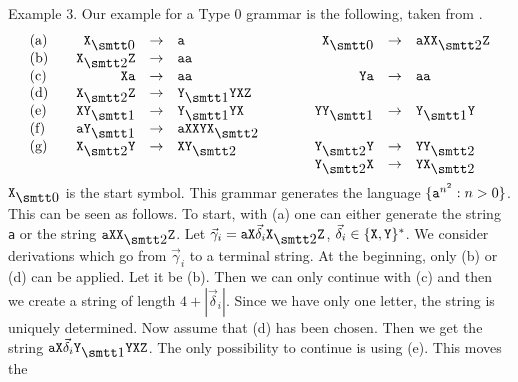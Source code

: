 {\sc Example 3.}
Our example for a Type 0 grammar is the following, taken from
\cite{salomaa:formal}.
\begin{equation}
\begin{array}{l@{\qquad}r@{\quad \pf \quad}l@{\qquad\qquad}%
r@{\quad \pf \quad}l}
{\rm (a)} & \mbox{\tt X}_{\snull}   & \mbox{\tt a}
    & \mbox{\tt X}_{\snull}   & \mbox{\tt aXX}_{\szwei} \mbox{\tt Z} \\
{\rm (b)} & \mbox{\tt X}_{\szwei} \mbox{\tt Z} & \mbox{\tt aa}
    & \multicolumn{2}{c}{} \\
{\rm (c)} & \mbox{\tt Xa}    & \mbox{\tt aa}
    & \mbox{\tt Ya}    & \mbox{\tt aa} \\
{\rm (d)} & \mbox{\tt X}_{\szwei} \mbox{\tt Z} & \mbox{\tt Y}_{\seins} \mbox{\tt YXZ}
    & \multicolumn{2}{c}{} \\
{\rm (e)} & \mbox{\tt XY}_{\seins} & \mbox{\tt Y}_{\seins} \mbox{\tt YX}
    & \mbox{\tt YY}_{\seins} & \mbox{\tt Y}_{\seins} \mbox{\tt Y} \\
{\rm (f)} & \mbox{\tt aY}_{\seins} & \mbox{\tt aXXYX}_{\szwei}
    & \multicolumn{2}{c}{} \\
{\rm (g)} & \mbox{\tt X}_{\szwei}\mbox{\tt Y}  & \mbox{\tt XY}_{\szwei}
    & \mbox{\tt Y}_{\szwei} \mbox{\tt Y} & \mbox{\tt YY}_{\szwei} \\
\multicolumn{3}{c}{}
    & \mbox{\tt Y}_{\szwei} \mbox{\tt X} & \mbox{\tt YX}_{\szwei}
\end{array}
\end{equation}
$\mbox{\tt X}_{\snull}$ is the start symbol. This grammar generates
the language $\{\mbox{\tt a}^{n^2} : n > 0\}$. This can be seen
as follows. To start, with (a) one can either generate the string
{\tt a} or the string $\mbox{\tt aXX}_{\szwei}\mbox{\tt Z}$. Let
$\vec{\gamma}_i = \mbox{\tt aX}\vec{\delta}_i %
\mbox{\tt X}_{\szwei} \mbox{\tt Z}$,
$\vec{\delta}_i \in \{\mbox{\tt X}, \mbox{\tt Y}\}^{\ast}$.
We consider derivations which go from $\vec{\gamma}_i$ to a
terminal string. At the beginning, only (b) or (d) can be applied.
Let it be (b). Then we can only continue with (c) and then we
create a string of length $4 + |\vec{\delta}_i|$. Since we
have only one letter, the string is uniquely determined.
Now assume that (d) has been chosen. Then we get the string
$\mbox{\tt aX}\vec{\delta}_i\mbox{\tt Y}_{\seins} \mbox{\tt YXZ}$.
The only possibility to continue is using (e). This moves the
